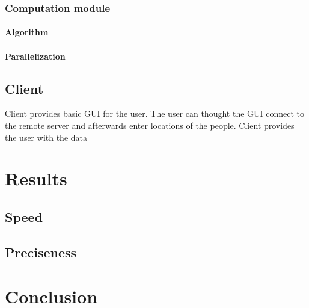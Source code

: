 \documentclass[thesis=M,english]{FITthesis}[2012/10/20]
\begin{document}
\subsection{Computation module}
\label{subsec:server_comp}
\subsubsection{Algorithm}

\subsubsection{Parallelization}

\section{Client}
\label{sec:RClient}
Client provides basic GUI for the user. The user can thought the GUI connect to the remote server and afterwards enter locations of the people. Client provides the user with the data 

\chapter{Results}
\label{ch:Results}

\section{Speed}

\section{Preciseness}

\chapter{Conclusion}




\appendix
\end{document}
